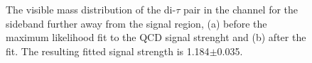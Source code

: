 \begin{figure}[h!]
\begin{center}
\end{center}
\caption{The visible mass distribution of the di-$\tau$ pair in the \mutau channel for the sideband further away from the signal region, (a) before
the maximum likelihood fit to the QCD signal strenght and (b) after the fit. The resulting fitted signal strength 
is 1.184$\pm$0.035.}
\label{fig:mssm_qcdosss_mtfar}
\end{figure}

